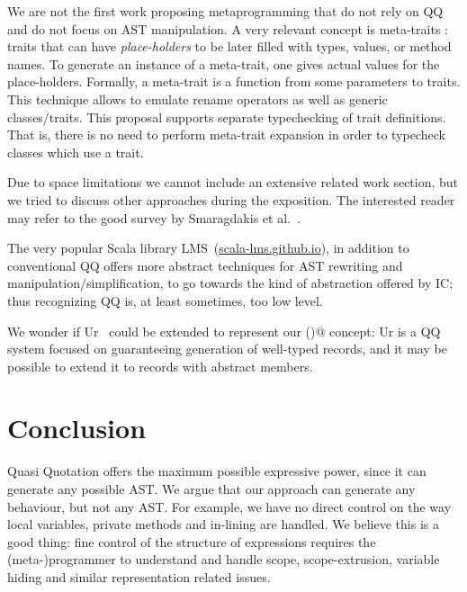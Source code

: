 We are not the first work proposing metaprogramming that do not rely on QQ and do not
focus on AST manipulation.
A very relevant concept is meta-traits \cite{reppy2007metaprogramming}:
 traits that can have \emph{place-holders} to be later filled with types, 
values, or method names.
To generate an instance of a meta-trait, one 
gives actual values for the place-holders. 
Formally, a meta-trait is a function from some parameters to traits.
This technique allows to emulate rename operators as well as generic classes/traits.
This proposal supports separate typechecking of trait definitions. That is, there is no need to perform meta-trait expansion
 in order to typecheck classes which use a trait.



Due to space limitations we cannot include an extensive related work section,
but we tried to discuss other approaches during the exposition.
The interested reader may refer to the good survey by Smaragdakis et al.~\cite{smaragdakis2015structured}.

The very popular Scala library LMS~(\url{scala-lms.github.io}), in addition to conventional QQ offers
more abstract techniques for AST rewriting and manipulation/simplification,
to go towards the kind of abstraction offered by IC;
thus recognizing QQ is, at least sometimes, too low level.

We wonder if Ur~\cite{chlipala2010ur} could be extended to represent our \Q@inductive()@ concept:
Ur is a QQ system focused on guaranteeing generation of well-typed records,
and it may be possible to extend it to records with abstract members.


\section{Conclusion}


Quasi Quotation offers the maximum possible expressive power, since it can generate any possible AST.
We argue that our approach can generate any behaviour, but not any AST.
For example, we have no direct control on the way local variables, private methods 
and in-lining are handled.
We believe this is a good thing: fine control of the structure of expressions requires
the (meta-)programmer to understand and handle scope, scope-extrusion, variable hiding and similar
representation related issues.


